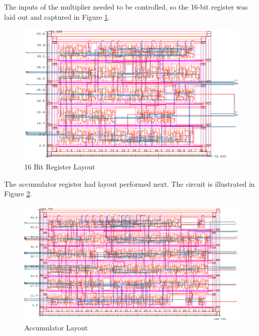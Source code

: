 \documentclass[11pt]{article}
\begin{document}
		The inputs of the multiplier needed to be controlled, so the 16-bit register was laid out and captured in Figure \ref{fig:nBitRegister-16-Bit-Layout}.
		
		\begin{figure}[H] 
			\centering 
			\includegraphics[width=\textwidth,height=\dimexpr\textheight-4\baselineskip-\abovecaptionskip-\belowcaptionskip\relax,keepaspectratio]{"Pictures/nBitRegister 16-Bit Layout"}
			\caption{16 Bit Register Layout} 
			\label{fig:nBitRegister-16-Bit-Layout} 
		\end{figure}
	
		The accumulator register had layout performed next. The circuit is illustrated in Figure \ref{fig:nBitRegister-32-Bit-Layout}. 
	
		\begin{figure}[H] 
			\centering 
			\includegraphics[width=\textwidth,height=\dimexpr\textheight-4\baselineskip-\abovecaptionskip-\belowcaptionskip\relax,keepaspectratio]{"Pictures/nBitRegister 32-Bit Layout"}
			\caption{Accumulator Layout} 
			\label{fig:nBitRegister-32-Bit-Layout} 
		\end{figure}
	
\end{document}
